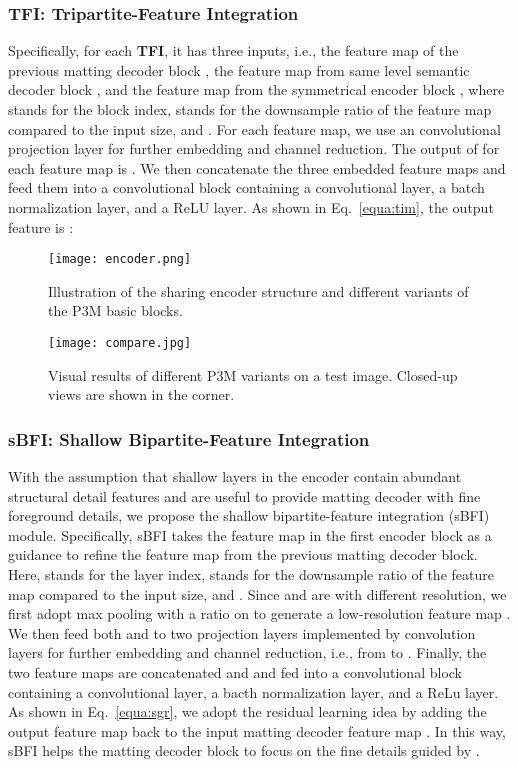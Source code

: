 \documentclass[twocolumn]{svjour3}
\begin{document}
\subsubsection{TFI: Tripartite-Feature Integration}
\label{sec:tim}
Specifically, for each \textbf{TFI}, it has three inputs, i.e., the feature map of the previous matting decoder block , the feature map from same level semantic decoder block , and the feature map from the symmetrical encoder block , where  stands for the block index,  stands for the downsample ratio of the feature map compared to the input size, and . For each feature map, we use an  convolutional projection layer  for further embedding and channel reduction. The output of  for each feature map is . We then concatenate the three embedded feature maps and feed them into a convolutional block  containing a
 convolutional layer, a batch normalization layer, and a ReLU layer. As shown in Eq.~\ref{equa:tim}, the output feature is :


\begin{figure*}[t]
    \centering
    \texttt{[image: encoder.png]}
    \caption{Illustration of the sharing encoder structure and different variants of the P3M basic blocks.}
    \label{fig:encoder}
\end{figure*}

\begin{figure*}[!t]
    \centering
    \texttt{[image: compare.jpg]}
    \caption{Visual results of different P3M variants on a test image. Closed-up views are shown in the corner.}
    \label{fig:variants_compare}
\end{figure*}


\subsubsection{sBFI: Shallow Bipartite-Feature Integration}
With the assumption that shallow layers in the encoder contain abundant structural detail features and are useful to provide matting decoder with fine foreground details, we propose the shallow bipartite-feature integration (sBFI) module. Specifically, sBFI takes the feature map  in the first encoder block as a guidance to refine the feature map  from the previous matting decoder block. Here,  stands for the layer index,  stands for the downsample ratio of the feature map compared to the input size, and . Since  and  are with different resolution, we first adopt max pooling  with a ratio  on  to generate a low-resolution feature map . We then feed both  and  to two projection layers  implemented by  convolution layers for further embedding and channel reduction, i.e., from  to . Finally, the two feature maps are concatenated and and fed into a convolutional block  containing a  convolutional layer, a bacth normalization layer, and a ReLu layer. As shown in Eq.~\ref{equa:sgr}, we adopt the residual learning idea by adding the output feature map back to the input matting decoder feature map . In this way, sBFI helps the matting decoder block to focus on the fine details guided by .
\end{document}
